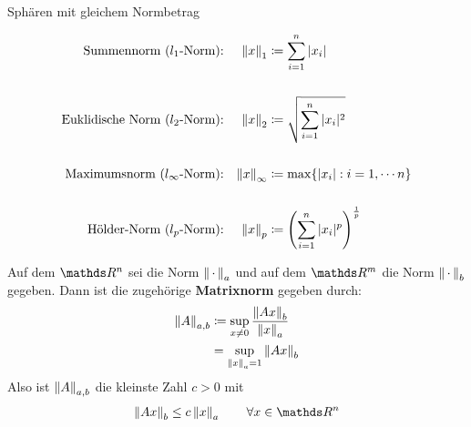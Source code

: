 \begin{Wdhe}[Normen]~
  \label{3.2.3}
  \begin{image}{Sphären mit gleichem Normbetrag}
  \end{image}
  
  \begin{align*}
    \text{Summennorm ($l_1$-Norm):} &&	\nn{x}_1 &\coloneqq \sum_{i=1}^{n}|x_i| 
                                                   \index{Norm!Summennorm}\\
    \\
    \text{Euklidische Norm ($l_2$-Norm):} &&	\nn{x}_2 &\coloneqq \sqrt{\sum_{i=1}^{n}|x_i|^2}
                                                           \index{Norm!Euklidische Norm} \\
    \\
    \text{Maximumsnorm ($l_\infty$-Norm):} &&\nn{x}_\infty &\coloneqq \max\{|x_i| : i=1, \cdots n\} \\
    \index{Norm!Maximumsnorm}
    \\
    \text{Hölder-Norm ($l_p$-Norm):} &&	\nn{x}_p &\coloneqq 
                                                   \left(\sum_{i=1}^{n}|x_i|^p\right)^{\frac{1}{p}} 
                                                   \index{Norm!Hölder-Norm}
  \end{align*}
\end{Wdhe}



\begin{Defe}
  \label{3.2.4}
  Auf dem $\R^n$  sei die Norm $\left\| \,\cdot\, \right\|_a$ und auf dem $\R^m$ die Norm $\left\| \,\cdot\, \right\|_b$ gegeben.
  Dann ist die zugehörige \textbf{Matrixnorm}  gegeben durch:
  \begin{align}
    \left\| A \right\|_{a,b} &\coloneqq \sup_{x\neq 0} \frac{\left\| Ax \right\|_b}{\left\| x \right\|_a} \\ \nonumber
                 &= \sup_{\left\| x \right\|_a=1} \left\| Ax \right\|_b \label{III.2.1} 
  \end{align}
  Also ist   $\left\| A \right\|_{a,b}$ die kleinste Zahl $c>0$ mit
  \begin{gather*}
    \nn{Ax}_b  \leq c\nn{x}_a \quad\quad \forall x\in \R^n
  \end{gather*}
\end{Defe}

